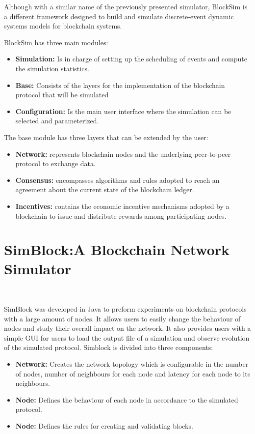 Although with a similar name of the previously presented simulator, BlockSim is a different 
framework designed to build and simulate discrete-event dynamic systems models for blockchain systems.

BlockSim has three main modules:
\begin{itemize}
  \item \textbf{Simulation:} Is in charge of setting up the scheduling of events and compute
  the simulation statistics.
  \item \textbf{Base:} Consists of the layers for the implementation of the blockchain protocol
  that will be simulated
  \item \textbf{Configuration:}  Is the main user interface where the simulation can be 
  selected and parameterized.
\end{itemize}

The base module has three layers that can be extended by the user:

\begin{itemize}
  \item \textbf{Network:} represents blockchain nodes and the underlying peer-to-peer protocol
  to exchange data.
  \item \textbf{Consensus:} encompasses algorithms and rules adopted to reach an agreement 
  about the current state of the blockchain ledger.
  \item \textbf{Incentives:} contains the economic incentive mechanisms adopted by a 
  blockchain to issue and distribute rewards among participating nodes.
\end{itemize}

\section{SimBlock:A Blockchain Network Simulator}~\label{subsec:simblock}

SimBlock was developed in Java to preform experiments on blockchain protocols
with a large amount of nodes. It allows users to easily change the behaviour of nodes
and study their overall impact on the network. It also provides users with a simple GUI for
users to load the output file of a simulation and observe evolution of the simulated protocol.
Simblock is divided into three components:

\begin{itemize}
  \item \textbf{Network:} Creates the network topology which is configurable in the number
  of nodes, number of neighbours for each node and latency for each node to its neighbours.
  \item \textbf{Node:} Defines the behaviour of each node in accordance to the simulated protocol.
  \item \textbf{Node:} Defines the rules for creating and validating blocks.
\end{itemize}

